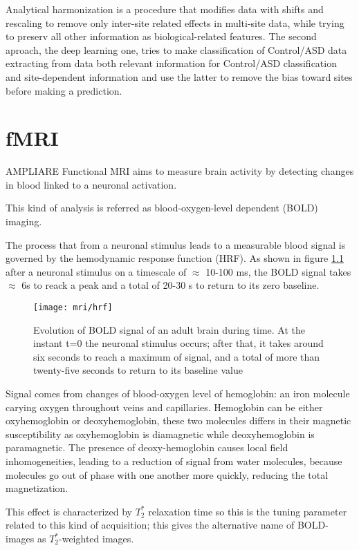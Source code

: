 \documentclass[11pt]{report}
\begin{document}
Analytical harmonization is a procedure that modifies data with shifts and rescaling to remove only inter-site related effects in multi-site data, while trying to preserv all other information as biological-related features.
The second aproach, the deep learning one, tries to make classification of Control/ASD data extracting from data both relevant information for Control/ASD classification and site-dependent information and use the latter to remove the bias toward sites before making a prediction.

\chapter{fMRI}\label{chap:fmri}
AMPLIARE
Functional MRI aims to measure brain activity by detecting changes in blood linked to a neuronal activation.

This kind of analysis is referred as blood-oxygen-level dependent (BOLD) imaging.


The process that from a neuronal stimulus leads to a measurable blood signal is governed by the hemodynamic response function (HRF).
As shown in figure \ref{fig:hrf} after a neuronal stimulus on a timescale of $\approx$ 10-100 ms, the BOLD signal takes $\approx$ 6s to reack a peak and a total of 20-30 s to return to its zero baseline.

\begin{figure}[h]
\centering
\texttt{[image: mri/hrf]}
\caption{Evolution of BOLD signal of an adult brain during time. At the instant t=0 the neuronal stimulus occurs; after that, it takes around six seconds to reach a maximum of signal, and a total of more than twenty-five seconds to return to its baseline value}
\label{fig:hrf}
\end{figure}

Signal comes from changes of blood-oxygen level of hemoglobin: an iron molecule carying oxygen throughout veins and capillaries.
Hemoglobin can be either oxyhemoglobin or deoxyhemoglobin, these two molecules differs in their magnetic susceptibility as oxyhemoglobin is diamagnetic while deoxyhemoglobin is paramagnetic.
The presence of deoxy-hemoglobin causes local field inhomogeneities, leading to a reduction of signal from water molecules, because molecules go out of phase with one another more quickly, reducing the total magnetization.

This effect is characterized by $T_2^{\ast}$ relaxation time so this is the tuning parameter related to this kind of acquisition; this gives the alternative name of BOLD-images as $T_2^{\ast}$-weighted images.
\end{document}

